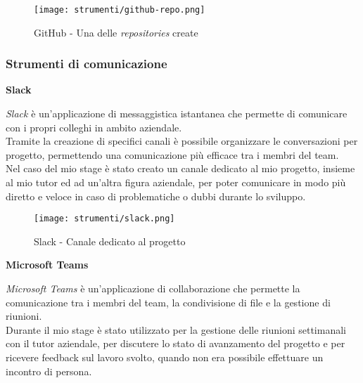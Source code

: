 \begin{figure}[H]
    \label{fig:github} 
    \centering
    \texttt{[image: strumenti/github-repo.png]}
    \caption{GitHub - Una delle \textit{repositories} create}
\end{figure}

\pagebreak
\subsubsection{Strumenti di comunicazione}
\label{sez:strumenti-comunicazione}


\noindent \textbf{Slack\\}

\noindent \textit{Slack} è un'applicazione di messaggistica istantanea che permette di comunicare con i propri colleghi in ambito aziendale. \\
Tramite la creazione di specifici canali è possibile organizzare le conversazioni per progetto, permettendo una comunicazione più efficace tra i membri del team.\\
Nel caso del mio stage è stato creato un canale dedicato al mio progetto, insieme al mio tutor ed ad un'altra figura aziendale, per poter comunicare in modo più diretto e veloce 
in caso di problematiche o dubbi durante lo sviluppo.

\begin{figure}[H]
    \label{fig:slack} 
    \centering
    \texttt{[image: strumenti/slack.png]}
    \caption{Slack - Canale dedicato al progetto}
\end{figure}

\noindent \textbf{Microsoft Teams\\}

\noindent \textit{Microsoft Teams} è un'applicazione di collaborazione che permette la comunicazione tra i membri del team, la condivisione di file e la gestione di riunioni.\\
Durante il mio stage è stato utilizzato per la gestione delle riunioni settimanali con il tutor aziendale, per discutere lo stato di avanzamento del progetto e per ricevere feedback sul lavoro svolto, quando
non era possibile effettuare un incontro di persona.
